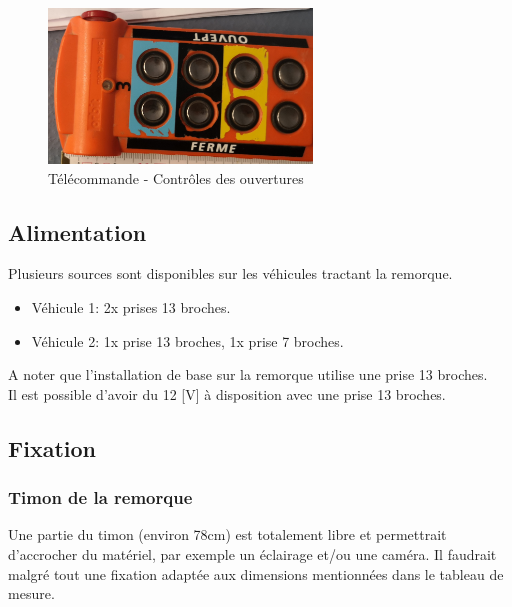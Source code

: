 \begin{figure}[H]
    \centering
    \includegraphics[width=7cm]{assets/figures/telecommande2.jpg}
    \caption{Télécommande - Contrôles des ouvertures}
\end{figure}

\subsection{Alimentation}
Plusieurs sources sont disponibles sur les véhicules tractant la remorque.
\begin{itemize}
    \item{Véhicule 1: 2x prises 13 broches.}
    \item{Véhicule 2: 1x prise 13 broches, 1x prise 7 broches.}
\end{itemize}
A noter que l'installation de base sur la remorque utilise une prise 13 broches.\\
Il est possible d'avoir du 12 [V] à disposition avec une prise 13 broches.

\subsection{Fixation}
\subsubsection{Timon de la remorque}
Une partie du timon (environ 78cm) est totalement libre et permettrait d'accrocher du matériel, par exemple un éclairage et/ou une caméra.
Il faudrait malgré tout une fixation adaptée aux dimensions mentionnées dans le tableau de mesure.
